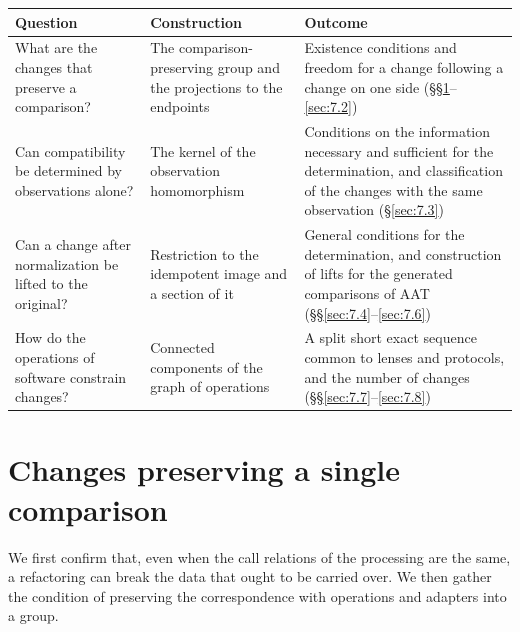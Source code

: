 \begin{xltabular}{\linewidth}{@{}LLL@{}}
\toprule
Question & Construction & Outcome \\
\midrule
\endhead
What are the changes that preserve a comparison? & The comparison-preserving group and the
projections to the endpoints & Existence conditions and freedom for a change following a
change on one side (\S\S\ref{sec:7.1}--\ref{sec:7.2}) \\
\addlinespace[3pt]
Can compatibility be determined by observations alone? & The kernel of the observation
homomorphism & Conditions on the information necessary and sufficient for the determination,
and classification of the changes with the same observation (\S\ref{sec:7.3}) \\
\addlinespace[3pt]
Can a change after normalization be lifted to the original? & Restriction to the idempotent
image and a section of it & General conditions for the determination, and construction of
lifts for the generated comparisons of AAT (\S\S\ref{sec:7.4}--\ref{sec:7.6}) \\
\addlinespace[3pt]
How do the operations of software constrain changes? & Connected components of the graph of
operations & A split short exact sequence common to lenses and protocols, and the number of changes
(\S\S\ref{sec:7.7}--\ref{sec:7.8}) \\
\bottomrule
\end{xltabular}

\section{Changes preserving a single comparison}\label{sec:7.1}

We first confirm that, even when the call relations of the processing are the same, a
refactoring can break the data that ought to be carried over.
We then gather the condition of preserving the correspondence with operations and adapters
into a group.

